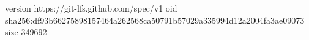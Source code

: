 version https://git-lfs.github.com/spec/v1
oid sha256:df93b66275898157464a262568ca50791b57029a335994d12a2004fa3ae09073
size 349692
